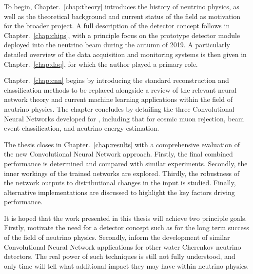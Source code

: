 To begin, Chapter.~\ref{chap:theory} introduces the history of neutrino physics, as well as the
theoretical background and current status of the field as motivation for the broader \chips
project. A full description of the \chips detector concept follows in Chapter.~\ref{chap:chips},
with a principle focus on the \chipsfive prototype detector module deployed into the \numi
neutrino beam during the autumn of 2019. A particularly detailed overview of the \chipsfive data
acquisition and monitoring systems is then given in Chapter.~\ref{chap:daq}, for which the author
played a primary role.

Chapter.~\ref{chap:cnn} begins by introducing the standard reconstruction and classification
methods to be replaced alongside a review of the relevant neural network theory and current
machine learning applications within the field of neutrino physics. The chapter concludes by
detailing the three Convolutional Neural Networks developed for \chipsfive, including that for
cosmic muon rejection, beam event classification, and neutrino energy estimation.

The thesis closes in Chapter.~\ref{chap:results} with a comprehensive evaluation of the new
Convolutional Neural Network approach. Firstly, the final combined performance is determined and
compared with similar experiments. Secondly, the inner workings of the trained networks are
explored. Thirdly, the robustness of the network outputs to distributional changes in the input is
studied. Finally, alternative implementations are discussed to highlight the key factors driving
performance.

It is hoped that the work presented in this thesis will achieve two principle goals. Firstly,
motivate the need for a detector concept such as \chips for the long term success of the field of
neutrino physics. Secondly, inform the development of similar Convolutional Neural Network
applications for other water Cherenkov neutrino detectors. The real power of such techniques is
still not fully understood, and only time will tell what additional impact they may have within
neutrino physics.
